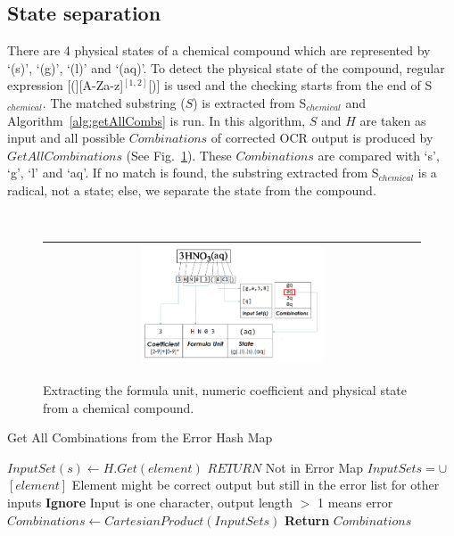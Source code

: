 \documentclass[oneside,a4paper,12pt]{book}
\begin{document}
\subsection{State separation}

  There are 4 physical states of a chemical compound which are represented by `(s)', `(g)', `(l)' and `(aq)'. To detect the physical state of the compound,  regular expression [(][A-Za-z]$^{[1,2]}$[)] is used and the checking starts from the end of S$_{chemical}$. The matched substring ($S$) is extracted from  S$_{chemical}$ and Algorithm~\ref{alg:getAllCombs} is run. 
In this algorithm, $S$ and $H$  are taken as input and all possible $Combinations$ of corrected OCR output is produced by $GetAllCombinations$ (See Fig.~\ref{stateCorrection}). These $Combinations$ are compared with `s', `g', `l' and `aq'. If no match is found, the substring extracted from S$_{chemical}$ is a radical, not a state; else, we separate the state from the compound. 

\begin{figure}[h]
\center\ 
\begin{tabular}{|c|} 
\hline
\includegraphics[width=0.5\textwidth]{stateCorrection.png}\\
\hline
\end{tabular} 
\caption{Extracting the formula unit, numeric coefficient and physical state from a chemical compound. }
\label{stateCorrection} 
\end{figure} 


\begin{algorithm}[!htb]
\large
\caption{Get All Combinations from the Error Hash Map}
\begin{algorithmic}[1]
		\State $InputSet(s) \leftarrow H.Get(element)$ 
			\State $RETURN$ \Comment Not in Error Map
		\Else
				\State $InputSets =\cup$ $[element]$ 
				\Statex \Comment Element might be correct output but still in the error list for other inputs
			\Else
				\State \textbf{Ignore}
				\Statex \Comment Input is one character, output length $>$ 1 means error
			\EndIf
		\EndIf
	\EndFor
\State $Combinations \leftarrow CartesianProduct(InputSets)$ %
\State  \textbf{Return} {$Combinations$}
\EndProcedure
\Statex
\end{algorithmic}
\label{alg:getAllCombs}
\end{algorithm}
\end{document}
